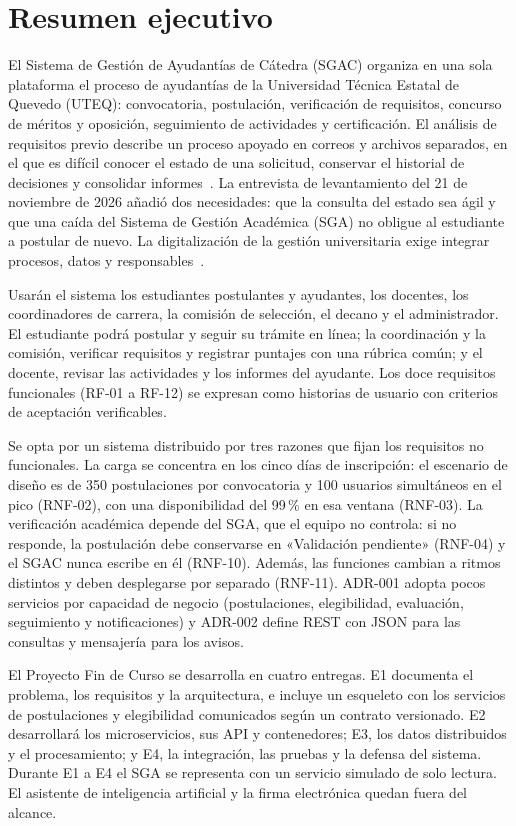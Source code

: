 \section{Resumen ejecutivo}
\label{sec:resumen-ejecutivo}

El Sistema de Gestión de Ayudantías de Cátedra (SGAC) organiza en una sola plataforma el proceso de ayudantías de la Universidad Técnica Estatal de Quevedo (UTEQ): convocatoria, postulación, verificación de requisitos, concurso de méritos y oposición, seguimiento de actividades y certificación. El análisis de requisitos previo describe un proceso apoyado en correos y archivos separados, en el que es difícil conocer el estado de una solicitud, conservar el historial de decisiones y consolidar informes~\cite{sgacAntecedente}. La entrevista de levantamiento del 21 de noviembre de 2026 añadió dos necesidades: que la consulta del estado sea ágil y que una caída del Sistema de Gestión Académica (SGA) no obligue al estudiante a postular de nuevo. La digitalización de la gestión universitaria exige integrar procesos, datos y responsables~\cite{fernandez2023digital,souli2025administracion}.

Usarán el sistema los estudiantes postulantes y ayudantes, los docentes, los coordinadores de carrera, la comisión de selección, el decano y el administrador. El estudiante podrá postular y seguir su trámite en línea; la coordinación y la comisión, verificar requisitos y registrar puntajes con una rúbrica común; y el docente, revisar las actividades y los informes del ayudante. Los doce requisitos funcionales (RF-01 a RF-12) se expresan como historias de usuario con criterios de aceptación verificables.

Se opta por un sistema distribuido por tres razones que fijan los requisitos no funcionales. La carga se concentra en los cinco días de inscripción: el escenario de diseño es de 350 postulaciones por convocatoria y 100 usuarios simultáneos en el pico (RNF-02), con una disponibilidad del 99\,\% en esa ventana (RNF-03). La verificación académica depende del SGA, que el equipo no controla: si no responde, la postulación debe conservarse en «Validación pendiente» (RNF-04) y el SGAC nunca escribe en él (RNF-10). Además, las funciones cambian a ritmos distintos y deben desplegarse por separado (RNF-11). ADR-001 adopta pocos servicios por capacidad de negocio (postulaciones, elegibilidad, evaluación, seguimiento y notificaciones) y ADR-002 define REST con JSON para las consultas y mensajería para los avisos.

El Proyecto Fin de Curso se desarrolla en cuatro entregas. E1 documenta el problema, los requisitos y la arquitectura, e incluye un esqueleto con los servicios de postulaciones y elegibilidad comunicados según un contrato versionado. E2 desarrollará los microservicios, sus API y contenedores; E3, los datos distribuidos y el procesamiento; y E4, la integración, las pruebas y la defensa del sistema. Durante E1 a E4 el SGA se representa con un servicio simulado de solo lectura. El asistente de inteligencia artificial y la firma electrónica quedan fuera del alcance.
